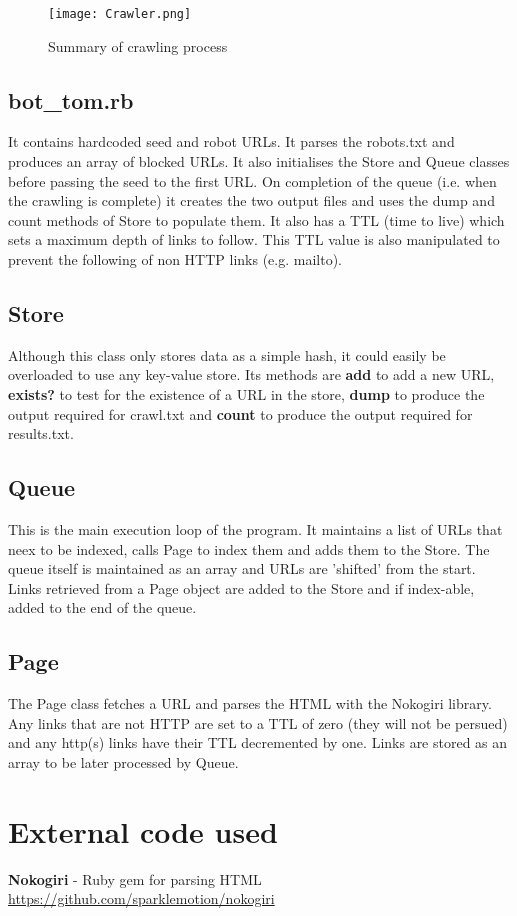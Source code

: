 \documentclass[a4paper,11pt]{article}
\begin{document}
\begin{figure}[h]
  \centering
  \texttt{[image: Crawler.png]}
  \caption{Summary of crawling process}
\end{figure}

\subsection{bot\_tom.rb}
It contains hardcoded seed and robot URLs.  It parses the robots.txt and produces an array of blocked URLs.  It also initialises the Store and Queue classes before passing the seed to the first URL.  On completion of the queue (i.e. when the crawling is complete) it creates the two output files and uses the dump and count methods of Store to populate them.  It also has a TTL (time to live) which sets a maximum depth of links to follow.  This TTL value is also manipulated to prevent the following of non HTTP links (e.g. mailto).

\subsection{Store}
Although this class only stores data as a simple hash, it could easily be overloaded to use any key-value store.  Its methods are \textbf{add} to add a new URL,  \textbf{exists?} to test for the existence of a URL in the store, \textbf{dump} to produce the output required for crawl.txt and \textbf{count} to produce the output required for results.txt.

\subsection{Queue}
This is the main execution loop of the program.  It maintains a list of URLs that neex to be indexed, calls Page to index them and adds them to the Store.  The queue itself is maintained as an array and URLs are 'shifted' from the start.  Links retrieved from a Page object are added to the Store and if index-able, added to the end of the queue.

\subsection{Page}
The Page class fetches a URL and parses the HTML with the Nokogiri library.  Any links that are not HTTP are set to a TTL of zero (they will not be persued) and any http(s) links have their TTL decremented by one.  Links are stored as an array to be later processed by Queue.

\section{External code used}
\textbf{Nokogiri} - Ruby gem for parsing HTML\\
\url{https://github.com/sparklemotion/nokogiri}
\end{document}
